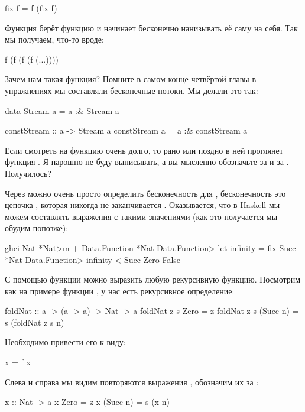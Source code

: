 \begin{code}
fix f = f (fix f)
\end{code}

Функция  берёт функцию и начинает бесконечно нанизывать её саму
на себя. Так мы получаем, что-то вроде:


\begin{code}
f (f (f (f (...))))
\end{code}

Зачем нам такая функция? Помните в самом конце четвёртой главы в
упражнениях мы составляли бесконечные потоки. Мы делали это так:


\begin{code}
data Stream a = a :& Stream a

constStream :: a -> Stream a
constStream a = a :& constStream a
\end{code}

Если смотреть на функцию  очень долго, то рано или
поздно в ней проглянет функция . Я нарошно не буду выписывать, а
вы мысленно обозначьте  за  и  за
. Получилось?

Через  можно очень просто определить бесконечность для ,
бесконечность это цепочка , которая никогда не заканчивается
. Оказывается, что в Haskell мы можем составлять выражения с
такими значениями (как это получается мы обудим попозже):


\begin{code}
ghci Nat
*Nat>m + Data.Function
*Nat Data.Function> let infinity = fix Succ
*Nat Data.Function> infinity < Succ Zero
False
\end{code}

С помощью функции  можно выразить любую рекурсивную функцию.
Посмотрим как на примере функции , у нас есть рекурсивное
определение:


\begin{code}
foldNat :: a -> (a -> a) -> Nat -> a
foldNat z  s  Zero      = z
foldNat z  s  (Succ n)  = s (foldNat z s n)
\end{code}

Необходимо привести его к виду:


\begin{code}
x = f x
\end{code}

Слева и справа мы видим повторяются выражения ,
обозначим их за :


\begin{code}
x :: Nat -> a
x Zero      = z
x (Succ n)  = s (x n)
\end{code}

